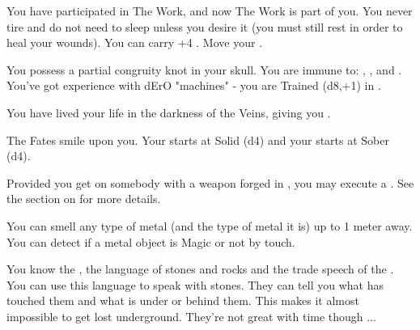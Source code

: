 \begin{multicols*}{2}
{{      \myskip

        You have participated in The Work, and now The Work is part of you.  You never tire and do not need to sleep unless you desire it (you must still rest in order to heal your wounds). You can carry +4 . Move your \TAL \DCUP.

      \myskip

        You possess a partial congruity knot in your skull.  You are immune to: , , and . You've got experience with dErO "machines" - you are Trained (d8,+1) in .

}}

\cbreak



  You have lived your life in the darkness of the Veins, giving you .



  The Fates smile upon you. Your \INJURY starts at Solid (d4) and your \INSANITY starts at Sober (d4). 



    Provided you get  on somebody with a weapon forged in , you may execute a . See the section on  for more details.


  You can smell any type of metal (and the type of metal it is) up to 1 meter away. You can detect if a metal object is Magic or not by touch.


  You know the , the language of stones and rocks and the trade speech of the .  You can use this language to speak with stones. They can tell you what has touched them and what is under or behind them.  This makes it almost impossible to get lost underground. They're not great with time though ...



\end{multicols*}
